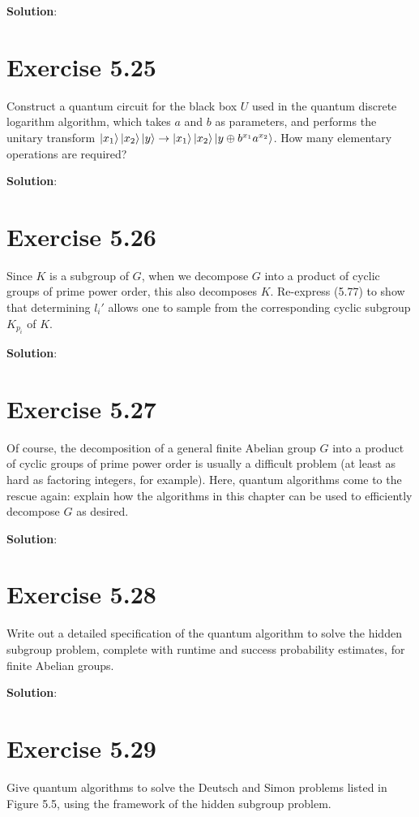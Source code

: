 \documentclass{book}
\begin{document}
    \textbf{Solution}:
    
\section*{Exercise 5.25}
    Construct a quantum circuit for the black box $U$ used in the quantum discrete logarithm algorithm, which takes $a$ and $b$ as parameters, and performs the unitary transform $\ket{x_1}\ket{x_2}\ket{y}\rightarrow\ket{x_1}\ket{x_2}\ket{y\oplus b^{x_1}a^{x_2}}$. How many elementary operations are required?
    
    \textbf{Solution}:
    
\section*{Exercise 5.26}
    Since $K$ is a subgroup of $G$, when we decompose $G$ into a product of cyclic groups of prime power order, this also decomposes $K$. Re-express (5.77) to show that determining $l_i'$ allows one to sample from the corresponding cyclic subgroup $K_{p_i}$ of $K$.
    
    \textbf{Solution}:
    
\section*{Exercise 5.27}
    Of course, the decomposition of a general finite Abelian group $G$ into a product of cyclic groups of prime power order is usually a difficult problem (at least as hard as factoring integers, for example). Here, quantum algorithms come to the rescue again: explain how the algorithms in this chapter can be used to efficiently decompose $G$ as desired.
    
    \textbf{Solution}:

\section*{Exercise 5.28}
    Write out a detailed specification of the quantum algorithm to solve the hidden subgroup problem, complete with runtime and success probability estimates, for finite Abelian groups.
    
    \textbf{Solution}:
    
\section*{Exercise 5.29}
    Give quantum algorithms to solve the Deutsch and Simon problems listed in Figure 5.5, using the framework of the hidden subgroup problem.
    
\end{document}
